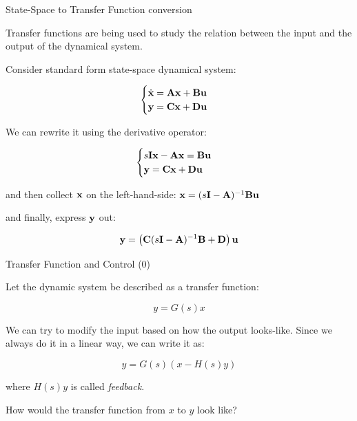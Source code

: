 \documentclass{beamer}
\begin{document}
\begin{frame}{State-Space to Transfer Function conversion}
\begin{flushleft}

Transfer functions are being used to study the relation between the input and the output of the dynamical system.

\bigskip

Consider standard form state-space dynamical system:

\begin{equation}
\begin{cases}
\dot{\mathbf{x}} = \mathbf{A}\mathbf{x} + \mathbf{B}\mathbf{u} \\
     \mathbf{y}  = \mathbf{C}\mathbf{x} + \mathbf{D}\mathbf{u}
\end{cases}
\end{equation}

We can rewrite it using the derivative operator:

\begin{equation}
\begin{cases}
s\mathbf{I}\mathbf{x} -\mathbf{A}\mathbf{x} = \mathbf{B}\mathbf{u} \\
\mathbf{y}  = \mathbf{C}\mathbf{x} + \mathbf{D}\mathbf{u}
\end{cases}
\end{equation}

and then collect $\mathbf{x}$ on the left-hand-side: $\mathbf{x} = (s\mathbf{I} -\mathbf{A})^{-1} \mathbf{B}\mathbf{u}$

and finally, express $\mathbf{y}$ out:

\begin{equation}
\mathbf{y}  = \left( \mathbf{C}(s\mathbf{I} -\mathbf{A})^{-1} \mathbf{B} + \mathbf{D} \right) \mathbf{u}
\end{equation}

\end{flushleft}
\end{frame}



\begin{frame}{Transfer Function and Control (0)}
	\begin{flushleft}
		
		Let the dynamic system be described as a transfer function:
		
		\begin{equation}
			y = G(s) x
		\end{equation}
		
		We can try to modify the input based on how the output looks-like. Since we always do it in a linear way, we can write it as:
		
		\begin{equation}
			y = G(s) (x - H(s) y)
		\end{equation}
		
		where $H(s) y$ is called \emph{feedback}.
		
		\bigskip
		
		How would the transfer function from $x$ to $y$ look like? 
		
	\end{flushleft}
\end{frame}
\end{document}
